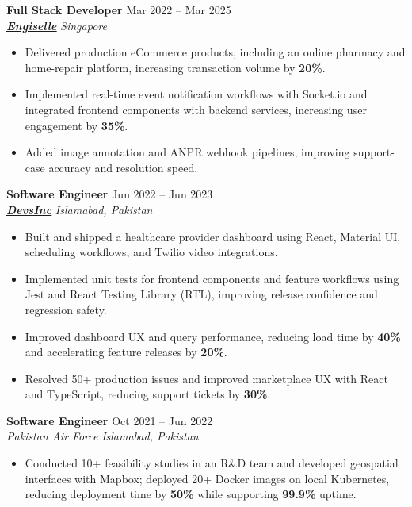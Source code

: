\documentclass[9pt,letterpaper]{article}
\newcommand{\role}[4]{\textbf{#1} \hfill #2 \\
\textit{#3} \hfill \textit{#4}\\[-4pt]}
\begin{document}
\role{Full Stack Developer}{Mar 2022 -- Mar 2025}{\href{https://www.engiselle.com/}{\textbf{\underline{Engiselle}}}}{Singapore}
\begin{itemize}[leftmargin=*, itemsep=0pt, topsep=0pt, partopsep=0pt, parsep=0pt, after=\vspace{2pt}]
  \item Delivered production eCommerce products, including an online pharmacy and home-repair platform, increasing transaction volume by \textbf{20\%}.
  \item Implemented real-time event notification workflows with Socket.io and integrated frontend components with backend services, increasing user engagement by \textbf{35\%}.
  \item Added image annotation and ANPR webhook pipelines, improving support-case accuracy and resolution speed.
\end{itemize}

\role{Software Engineer}{Jun 2022 -- Jun 2023}{\href{https://www.devsinc.com/}{\textbf{\underline{DevsInc}}}}{Islamabad, Pakistan}
\begin{itemize}[leftmargin=*, itemsep=0pt, topsep=0pt, partopsep=0pt, parsep=0pt, after=\vspace{2pt}]
  \item Built and shipped a healthcare provider dashboard using React, Material UI, scheduling workflows, and Twilio video integrations.
  \item Implemented unit tests for frontend components and feature workflows using Jest and React Testing Library (RTL), improving release confidence and regression safety.
  \item Improved dashboard UX and query performance, reducing load time by \textbf{40\%} and accelerating feature releases by \textbf{20\%}.
  \item Resolved 50+ production issues and improved marketplace UX with React and TypeScript, reducing support tickets by \textbf{30\%}.
\end{itemize}

\role{Software Engineer}{Oct 2021 -- Jun 2022}{Pakistan Air Force}{Islamabad, Pakistan}
\begin{itemize}[leftmargin=*, itemsep=0pt, topsep=0pt, partopsep=0pt, parsep=0pt, after=\vspace{2pt}]
  \item Conducted 10+ feasibility studies in an R\&D team and developed geospatial interfaces with Mapbox; deployed 20+ Docker images on local Kubernetes, reducing deployment time by \textbf{50\%} while supporting \textbf{99.9\%} uptime.
\end{itemize}
\end{document}
